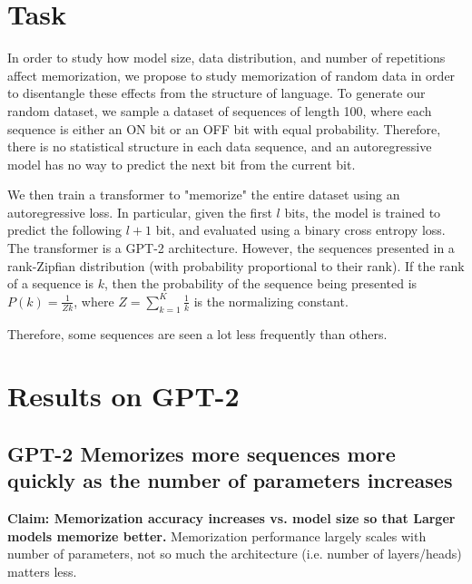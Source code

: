 \documentclass{article}
\theoremstyle{plain}
\theoremstyle{definition}
\theoremstyle{remark}
\begin{document}
\section{Task}
In order to study how model size, data distribution, and number of repetitions affect memorization, 
we propose to study memorization of random data in order to disentangle these effects from the structure of language. 
To generate our random dataset, we sample a dataset of sequences of length 100, where each sequence is either an ON bit or an OFF bit with equal probability. 
Therefore, there is no statistical structure in each data sequence, and an autoregressive model has no way to predict the next bit from the current bit. 

We then train a transformer to "memorize" the entire dataset using an autoregressive loss. 
In particular, given the first $l$ bits, the model is trained to predict the following $l+1$ bit, and evaluated using a binary cross entropy loss.
The transformer is a GPT-2 architecture. 
However, the sequences presented in a rank-Zipfian distribution (with probability proportional to their rank). 
If the rank of a sequence is $k$, then the probability of the sequence being presented is $P(k) = \frac{1}{Zk}$, 
where $Z=\sum_{k=1}^K \frac{1}{k}$ is the normalizing constant.

Therefore, some sequences are seen a lot less frequently than others.

\section{Results on GPT-2}
\subsection{GPT-2 Memorizes more sequences more quickly as the number of parameters increases}
\textbf{Claim: Memorization accuracy increases vs. model size so that Larger models memorize better.} 
Memorization performance largely scales with number of parameters, not so much the architecture (i.e. number of layers/heads) matters less. 
\end{document}
